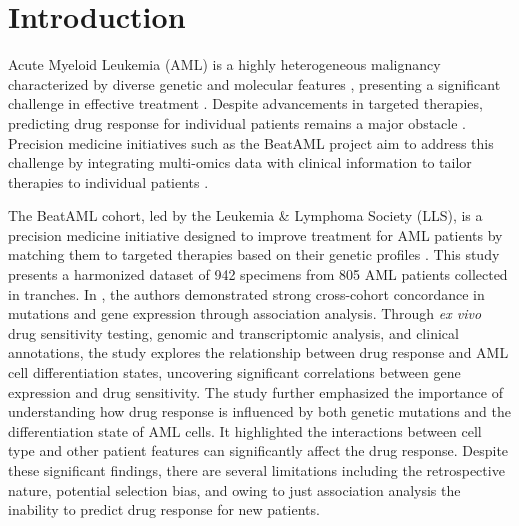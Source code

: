 \documentclass[runningheads,10pt]{llncs}
\begin{document}
\section{Introduction}
Acute Myeloid Leukemia (AML) is a highly heterogeneous malignancy characterized by diverse genetic and molecular features \cite{cancer2013genomic,papaemmanuil2016genomic}, presenting a significant challenge in effective treatment \cite{pulte2016survival}. Despite advancements in targeted therapies, predicting drug response for individual patients remains a major obstacle \cite{tyner2018functional}. Precision medicine initiatives such as the BeatAML project aim to address this challenge by integrating multi-omics data with clinical information to tailor therapies to individual patients \cite{tyner2018functional,bottomly2022integrative,burd2020precision}.

The BeatAML cohort, led by the Leukemia \& Lymphoma Society (LLS), is a precision medicine initiative designed to improve treatment for AML patients by matching them to targeted therapies based on their genetic profiles \cite{burd2020precision}. 
This study presents a harmonized dataset of 942 specimens from 805 AML patients collected in tranches. 
In \cite{bottomly2022integrative}, the authors demonstrated strong cross-cohort concordance in mutations and gene expression through association analysis. 
Through \textit{ex vivo} drug sensitivity testing, genomic and transcriptomic analysis, and clinical annotations, the study \cite{bottomly2022integrative} explores the relationship between drug response and AML cell differentiation states, uncovering significant correlations between gene expression and drug sensitivity. 
The study \cite{bottomly2022integrative} further emphasized the importance of understanding how drug response is influenced by both genetic mutations and the differentiation state of AML cells. 
It highlighted the interactions between cell type and other patient features can significantly affect the drug response. Despite these significant findings, there are several limitations including the retrospective nature, potential selection bias, and owing to just association analysis the inability to predict drug response for new patients. 
\end{document}
